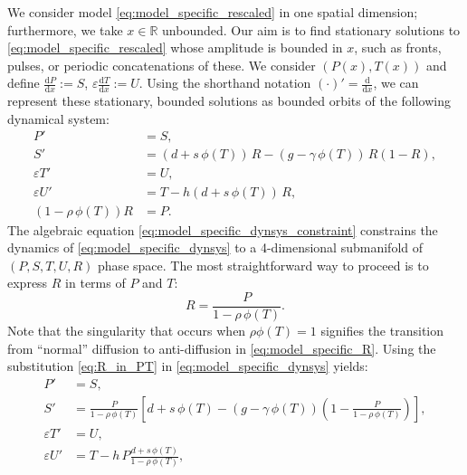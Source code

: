 \documentclass[a4paper,10pt,abstract=true,parskip=true]{scrartcl}
\theoremstyle{remark}
\numberwithin{equation}{section}
\numberwithin{thm}{section}
\newcommand{\eps}{\varepsilon}
\begin{document}

We consider model \eqref{eq:model_specific_rescaled} in one spatial dimension; furthermore, we take $x \in \mathbb{R}$ unbounded. Our aim is to find stationary solutions to \eqref{eq:model_specific_rescaled} whose amplitude is bounded in $x$, such as fronts, pulses, or periodic concatenations of these. 
We consider $(P(x),T(x))$ and define $\frac{\text{d} P}{\text{d}x} := S$, $\eps \frac{\text{d} T}{\text{d} x} := U$. Using the shorthand notation $(\cdot)' = \frac{\text{d}}{\text{d} x}$, we can represent these stationary, bounded solutions as bounded orbits of the following dynamical system:
\begin{subequations}\label{eq:model_specific_dynsys}
    \begin{align}
        P' &= S,\\
        S' &= \left(d+s\,\phi(T)\right)\,R - \left(g - \gamma\,\phi(T)\right)\,R\left(1-R\right),\\
        \eps T' &= U,\\
        \eps U' &= T - h\left(d + s\,\phi(T)\right)\,R,\\
        \left(1 - \rho\,\phi(T)\right)R &= P.~\label{eq:model_specific_dynsys_constraint}
    \end{align}
\end{subequations}
The algebraic equation \eqref{eq:model_specific_dynsys_constraint} constrains the dynamics of \eqref{eq:model_specific_dynsys} to a 4-dimensional submanifold of $(P,S,T,U,R)$ phase space. The most straightforward way to proceed is to express $R$ in terms of $P$ and $T$:
\begin{equation}\label{eq:R_in_PT}
    R = \frac{P}{1 - \rho\,\phi(T)}.
\end{equation}
Note that the singularity that occurs when $\rho \phi(T) = 1$ signifies the transition from ``normal'' diffusion to anti-diffusion in \eqref{eq:model_specific_R}. Using the substitution \eqref{eq:R_in_PT} in \eqref{eq:model_specific_dynsys} yields:
\begin{subequations}\label{eq:model_specific_dynsys_inP}
    \begin{align}
        P' &= S,\\
        S' &= \frac{P}{1 - \rho\,\phi(T)}\left[d+s\,\phi(T) - \left(g - \gamma\,\phi(T)\right)\left(1-\frac{P}{1 - \rho\,\phi(T)}\right)\right],\\
        \eps T' &= U,\\
        \eps U' &= T - h\,P\frac{d + s\,\phi(T)}{1 - \rho\,\phi(T)},
    \end{align}
\end{subequations}
\end{document}
